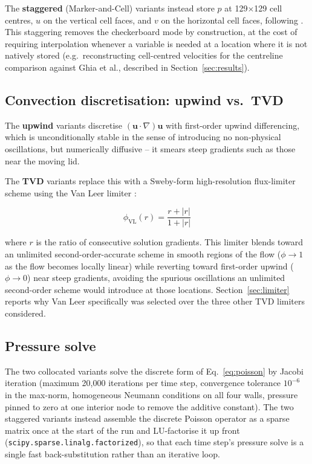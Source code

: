 \documentclass[CHICAGO]{USG}
\begin{document}
The \textbf{staggered} (Marker-and-Cell) variants instead store $p$ at 129$\times$129 cell centres, $u$ on the vertical cell faces, and $v$ on the horizontal cell faces, following \citet{harlow1965}. This staggering removes the checkerboard mode by construction, at the cost of requiring interpolation whenever a variable is needed at a location where it is not natively stored (e.g.\ reconstructing cell-centred velocities for the centreline comparison against Ghia et al., described in Section~\ref{sec:results}).

\subsection{Convection discretisation: upwind vs.\ TVD}

The \textbf{upwind} variants discretise $(\mathbf{u} \cdot \nabla)\mathbf{u}$ with first-order upwind differencing, which is unconditionally stable in the sense of introducing no non-physical oscillations, but numerically diffusive -- it smears steep gradients such as those near the moving lid.

The \textbf{TVD} variants replace this with a Sweby-form \citep{sweby1984} high-resolution flux-limiter scheme using the Van Leer limiter \citep{vanleer1974}:

\begin{equation}
\phi_{\mathrm{VL}}(r) = \frac{r + |r|}{1+|r|}
\label{eq:vanleer}
\end{equation}

where $r$ is the ratio of consecutive solution gradients. This limiter blends toward an unlimited second-order-accurate scheme in smooth regions of the flow ($\phi \to 1$ as the flow becomes locally linear) while reverting toward first-order upwind ($\phi \to 0$) near steep gradients, avoiding the spurious oscillations an unlimited second-order scheme would introduce at those locations. Section~\ref{sec:limiter} reports why Van Leer specifically was selected over the three other TVD limiters considered.

\subsection{Pressure solve}

The two collocated variants solve the discrete form of Eq.~\eqref{eq:poisson} by Jacobi iteration (maximum 20,000 iterations per time step, convergence tolerance $10^{-6}$ in the max-norm, homogeneous Neumann conditions on all four walls, pressure pinned to zero at one interior node to remove the additive constant). The two staggered variants instead assemble the discrete Poisson operator as a sparse matrix once at the start of the run and LU-factorise it up front (\texttt{scipy.sparse.linalg.factorized}), so that each time step's pressure solve is a single fast back-substitution rather than an iterative loop.
\end{document}
